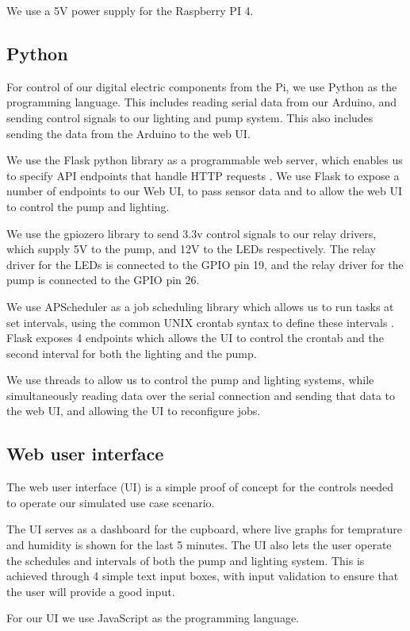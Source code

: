 \documentclass[a4paper,12pt,twoside,openright,titlepage]{book}
\begin{document}
We use a 5V power supply for the Raspberry PI 4.

\subsection{Python}
For control of our digital electric components from the Pi, we use Python as the programming language.
This includes reading serial data from our Arduino, and sending control signals to our lighting and pump system. This also includes sending the data from the Arduino to the web UI.

We use the Flask python library as a programmable web server, which enables us to specify API endpoints that handle HTTP requests \cite{flask}.
We use Flask to expose a number of endpoints to our Web UI, to pass sensor data and to allow the web UI to control the pump and lighting.

We use the gpiozero library to send 3.3v control signals to our relay drivers, which supply 5V to the pump, and 12V to the LEDs respectively.
The relay driver for the LEDs is connected to the GPIO pin 19, and the relay driver for the pump is connected to the GPIO pin 26.

We use APScheduler as a job scheduling library which allows us to run tasks at set intervals, using the common UNIX crontab syntax to define these intervals \cite{apscheduler}.
Flask exposes 4 endpoints which allows the UI to control the crontab and the second interval for both the lighting and the pump.

We use threads to allow us to control the pump and lighting systems, while simultaneously reading data over the serial connection and sending that data to the web UI, and allowing the UI to reconfigure jobs.

\subsection{Web user interface}
The web user interface (UI) is a simple proof of concept for the controls needed to operate our simulated use case scenario.

The UI serves as a dashboard for the cupboard, where live graphs for temprature and humidity is shown for the last 5 minutes.
The UI also lets the user operate the schedules and intervals of both the pump and lighting system. This is achieved through 4 simple text input boxes, with input validation to ensure that the user will provide a good input.

For our UI we use JavaScript as the programming language.
\end{document}
